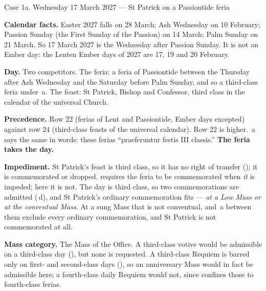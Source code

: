 \begin{casebox}{Case 1a. Wednesday 17 March 2027 --- St Patrick on a
Passiontide feria}

\textbf{Calendar facts.} Easter 2027 falls on 28 March; Ash Wednesday on 10
February; Passion Sunday (the First Sunday of the Passion) on 14 March; Palm
Sunday on 21 March. So 17 March 2027 is the Wednesday after Passion Sunday. It
is not an Ember day: the Lenten Ember days of 2027 are 17, 19 and 20 February.

\begin{steps}
\item \textbf{Day.} Two competitors. The feria: a feria of Passiontide between
the Thursday after Ash Wednesday and the Saturday before Palm Sunday, and so a
third-class feria under \,a. The feast: St Patrick, Bishop and
Confessor, third class in the calendar of the universal Church.

\item \textbf{Precedence.} Row 22 (ferias of Lent and Passiontide, Ember days
excepted) against row 24 (third-class feasts of the universal calendar). Row 22
is higher. \,a says the same in words: these ferias ``praeferuntur
festis III classis.'' \textbf{The feria takes the day.}

\item \textbf{Impediment.} St Patrick's feast is third class, so it has no
right of transfer (); it is commemorated or dropped.  requires
the feria to be commemorated when \emph{it} is impeded; here it is not. The
day is third class, so two commemorations are admitted (\,d), and St
Patrick's ordinary commemoration fits --- \emph{at a Low Mass or at the
conventual Mass}. At a sung Mass that is not conventual,  and
\,a between them exclude every ordinary commemoration, and St Patrick
is not commemorated at all.

\item \textbf{Mass category.} The Mass of the Office. A third-class votive
would be admissible on a third-class day (), but none is requested. A
third-class Requiem is barred only on first- and second-class days
(), so an anniversary Mass would in fact be admissible here; a
fourth-class daily Requiem would not, since  confines those to
fourth-class ferias.


\end{steps}
\end{casebox}
